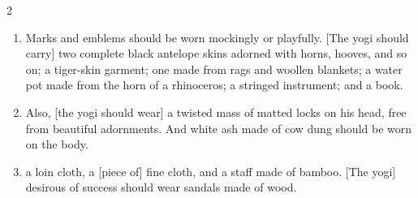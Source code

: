 \begin{nohyp}
\begin{multicols}{2}
\begin{eng}

\begin{enumerate}[nosep]
\item[13–14.] Marks and emblems should be worn mockingly or playfully. [The yogi should carry] two complete black antelope skins adorned with horns, hooves, and so on; a tiger-skin garment; one made from rags and woollen blankets; a water pot made from the horn of a rhinoceros; a stringed instrument; and a book.
\item[15.] Also, [the yogi should wear] a twisted mass of matted locks on his head, free from beautiful adornments. And white ash made of cow dung should be worn on the body.
\item[16.] [He should have] a loin cloth, a [piece of] fine cloth, and a staff made of bamboo. [The yogi] desirous of success should wear sandals made of wood.
\end{enumerate}
\columnbreak



\end{eng}
\end{multicols}
\end{nohyp}
